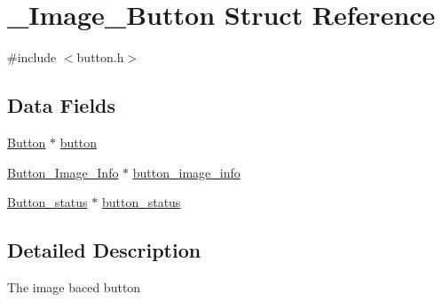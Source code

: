 \hypertarget{struct___image___button}{\section{\+\_\+\+Image\+\_\+\+Button Struct Reference}
\label{struct___image___button}
}


{\ttfamily \#include $<$button.\+h$>$}

\subsection*{Data Fields}
\begin{DoxyCompactItemize}
\item 
\hyperlink{button_8h_a7ac808241c1224e4caaee5a00ef0b231}{Button} $\ast$ \hyperlink{struct___image___button_afcbb5b54142bac4e305b31cbebe41064}{button}
\item 
\hyperlink{button_8h_aaaa592c3199b026905e2a99cd00c7110}{Button\+\_\+\+Image\+\_\+\+Info} $\ast$ \hyperlink{struct___image___button_abe7ec1033c8966c23ea31920649178bf}{button\+\_\+image\+\_\+info}
\item 
\hyperlink{button_8h_a380cba32ff506aefafa5ce913c2c972c}{Button\+\_\+status} $\ast$ \hyperlink{struct___image___button_af1ab6c7287e67a55a8e855e08302f8be}{button\+\_\+status}
\end{DoxyCompactItemize}


\subsection{Detailed Description}
The image baced button 

